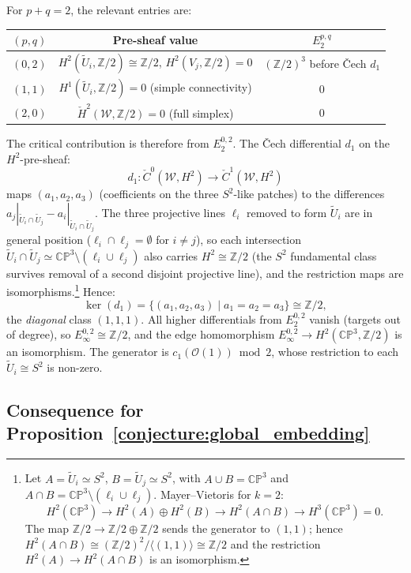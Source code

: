 \documentclass[11pt,a4paper]{article}
\theoremstyle{remark}
\newcommand{\CP}{\mathbb{CP}}
\newcommand{\Z}{\mathbb{Z}}
\newcommand{\cO}{\mathcal{O}}
\begin{document}
For $p+q = 2$, the relevant entries are:
\begin{center}
\begin{tabular}{c|c|c}
  $(p,q)$ & Pre-sheaf value & $E_2^{p,q}$ \\ \hline
  $(0,2)$ & $H^2(\tilde{U}_i, \Z/2) \cong \Z/2$,
    $H^2(V_j, \Z/2) = 0$ & $(\Z/2)^3$ before Čech $d_1$ \\
  $(1,1)$ & $H^1(\tilde{U}_i, \Z/2) = 0$ (simple connectivity) & $0$ \\
  $(2,0)$ & $\check{H}^2(\mathcal{W}, \Z/2) = 0$ (full simplex) & $0$
\end{tabular}
\end{center}

The critical contribution is therefore from $E_2^{0,2}$. The Čech
differential $d_1$ on the $H^2$-pre-sheaf:
\[
  d_1: \check{C}^0(\mathcal{W}, H^2) \to
    \check{C}^1(\mathcal{W}, H^2)
\]
maps $(a_1,a_2,a_3)$ (coefficients on the three $S^2$-like patches)
to the differences $a_j|_{\tilde{U}_i \cap \tilde{U}_j}
- a_i|_{\tilde{U}_i \cap \tilde{U}_j}$. The three projective lines
$\ell_i$ removed to form $\tilde{U}_i$ are in general position
($\ell_i \cap \ell_j = \emptyset$ for $i \neq j$), so each
intersection $\tilde{U}_i \cap \tilde{U}_j
\simeq \CP^3 \setminus (\ell_i \cup \ell_j)$ also carries
$H^2 \cong \Z/2$ (the $S^2$ fundamental class survives removal of
a second disjoint projective line), and the restriction maps are
isomorphisms.\footnote{%
  Let $A = \tilde{U}_i \simeq S^2$, $B = \tilde{U}_j \simeq S^2$,
  with $A \cup B = \CP^3$ and $A \cap B = \CP^3 \setminus (\ell_i \cup \ell_j)$.
  Mayer--Vietoris for $k=2$:
  \[
  H^2(\CP^3) \to H^2(A) \oplus H^2(B) \to H^2(A \cap B) \to H^3(\CP^3)=0.
  \]
  The map $\Z/2 \to \Z/2\oplus\Z/2$ sends the generator to $(1,1)$;
  hence $H^2(A \cap B) \cong (\Z/2)^2/\langle(1,1)\rangle \cong \Z/2$
  and the restriction $H^2(A) \to H^2(A \cap B)$ is an isomorphism.%
}
Hence:
\[
  \ker(d_1) = \{(a_1,a_2,a_3) \mid a_1 = a_2 = a_3\} \cong \Z/2,
\]
the \emph{diagonal} class $(1,1,1)$. All higher differentials from
$E_2^{0,2}$ vanish (targets out of degree), so
$E_\infty^{0,2} \cong \Z/2$, and the edge homomorphism
$E_\infty^{0,2} \to H^2(\CP^3, \Z/2)$ is an isomorphism. The
generator is $c_1(\cO(1)) \bmod 2$, whose restriction to each
$\tilde{U}_i \cong S^2$ is non-zero.

\subsection{Consequence for Proposition~\ref{conjecture:global_embedding}}
\label{sec:conj42-transgression}
\end{document}
